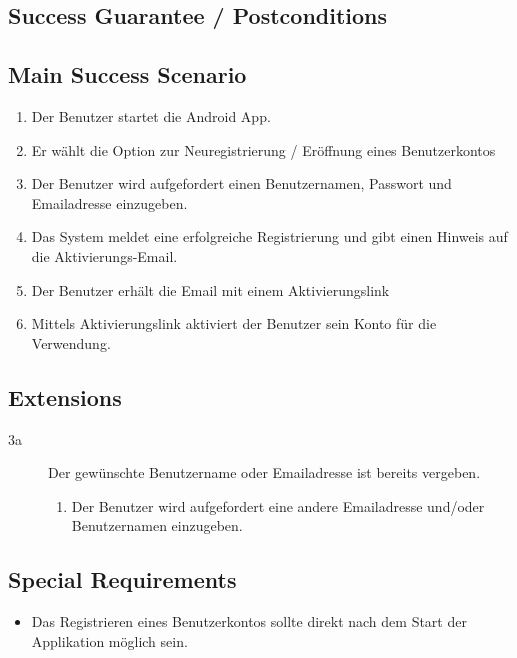 \documentclass[10pt,a4paper]{scrartcl}
\begin{document}
\subsection*{Success Guarantee / Postconditions}


\subsection*{Main Success Scenario}

\begin{enumerate}
\item Der Benutzer startet die Android App.
\item Er wählt die Option zur Neuregistrierung / Eröffnung eines Benutzerkontos
\item Der Benutzer wird aufgefordert einen Benutzernamen, Passwort und Emailadresse einzugeben.
\item Das System meldet eine erfolgreiche Registrierung und gibt einen Hinweis auf die Aktivierungs-Email.
\item Der Benutzer erhält die Email mit einem Aktivierungslink
\item Mittels Aktivierungslink aktiviert der Benutzer sein Konto für die Verwendung. 
\end{enumerate}


\subsection*{Extensions}

\begin{description}
\item[3a] Der gewünschte Benutzername oder Emailadresse ist bereits vergeben.
	\begin{enumerate}
	\item Der Benutzer wird aufgefordert eine andere Emailadresse und/oder Benutzernamen 		einzugeben.
	\end{enumerate}

\end{description}


\subsection*{Special Requirements}

\begin{itemize}
\item Das Registrieren eines Benutzerkontos sollte direkt nach dem Start der Applikation möglich sein. 
\end{itemize}
\end{document}
